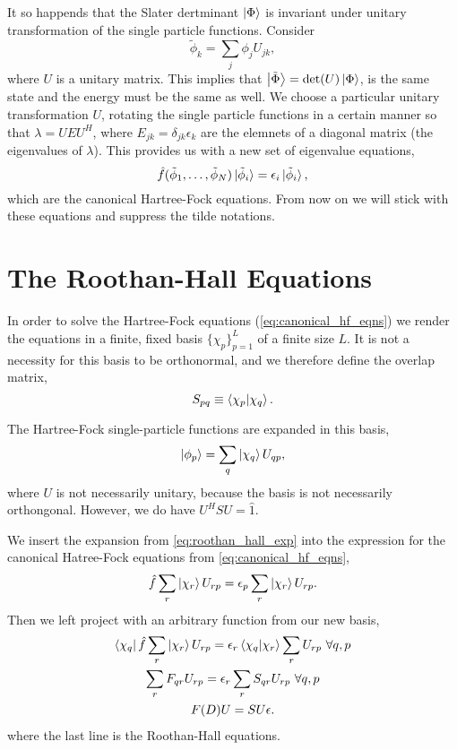 It so happends that the Slater dertminant $\ket{\Phi}$ is invariant under unitary
transformation of the single particle functions. Consider
\begin{equation}
    \tilde{\phi}_k = \sum_j \phi_j U_{jk},
\end{equation}
where $U$ is a unitary matrix. This implies that $\ket{\tilde{\Phi}} = \det(U)\ket{\Phi}$,
is the same state and the energy must be the same as well. We choose a particular
unitary transformation $U$, rotating the single particle functions in a certain 
manner so that $\lambda = UEU^H$, where $E_{jk} = \delta_{jk}\epsilon_k$ are the 
elemnets of a diagonal matrix (the eigenvalues of $\lambda$). This provides us with 
a new set of eigenvalue equations,
\begin{equation}
    \label{eq:canonical_hf_eqns}
    \hat{f}(\tilde{\phi}_1, \dots, \tilde{\phi}_N)\ket*{\tilde{\phi}_i}
        = \epsilon_i \ket*{\tilde{\phi}_i},
\end{equation}
which are the canonical Hartree-Fock equations. From now on we will stick with these 
equations and suppress the tilde notations.

\section{The Roothan-Hall Equations}

In order to solve the Hartree-Fock equations (\autoref{eq:canonical_hf_eqns}) we 
render the equations in a finite, fixed basis $\{\chi_p \}_{p=1}^L$ of a finite 
size $L$. It is not a necessity for this basis to be orthonormal, and we therefore 
define the overlap matrix,
\begin{equation}
    S_{pq} \equiv \braket{\chi_p}{\chi_q}.
\end{equation}

The Hartree-Fock single-particle functions are expanded in this basis,
\begin{equation}
    \label{eq:roothan_hall_exp}
    \ket{\phi_p} = \sum_q \ket{\chi_q} U_{qp},
\end{equation}
where $U$ is not necessarily unitary, because the basis is not necessarily 
orthongonal. However, we do have $U^HSU = \hat{1}$.

We insert the expansion from \autoref{eq:roothan_hall_exp} into the expression 
for the canonical Hatree-Fock equations from \autoref{eq:canonical_hf_eqns},
\begin{equation}
    \hat{f}\sum_r \ket{\chi_r} U_{rp} = \epsilon_p \sum_r \ket{\chi_r} U_{rp}.
\end{equation}
Then we left project with an arbitrary function from our new basis,
\begin{equation}
    \begin{gathered}
        \bra{\chi_q} \hat{f} \sum_r \ket{\chi_r} U_{rp}
            = \epsilon_r \braket{\chi_q}{\chi_r} \sum_r U_{rp}\ \forall q,p \\
        \sum_r F_{qr} U_{rp} = \epsilon_r \sum_r S_{qr} U_{rp}\ \forall q,p \\
        F(D) U = S U \epsilon.
    \end{gathered}
\end{equation}
where the last line is the Roothan-Hall equations.

